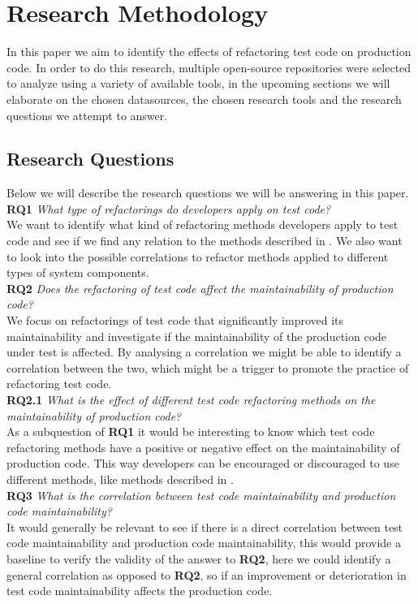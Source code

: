 
\section{Research Methodology}
In this paper we aim to identify the effects of refactoring test code on production code. In order to do this research, multiple open-source repositories were selected to analyze using a variety of available tools, in the upcoming sections we will elaborate on the chosen datasources, the chosen research tools and the research questions we attempt to answer.

\subsection{Research Questions}\label{rqs}
Below we will describe the research questions we will be answering in this paper.\\
\indent\textbf{RQ1} \textit{What type of refactorings do developers apply on test code?}\\
We want to identify what kind of refactoring methods developers apply to test code and see if we find any relation to the methods described in \cite{van2001refactoring}. We also want to look into the possible correlations to refactor methods applied to different types of system components.\\
\indent\textbf{RQ2} \textit{Does the refactoring of test code affect the maintainability of production code?}\\
We focus on refactorings of test code that significantly improved its maintainability and investigate if the maintainability of the production code under test is affected. By analysing a correlation we might be able to identify a correlation between the two, which might be a trigger to promote the practice of refactoring test code.\\
\indent\textbf{RQ2.1} \textit{What is the effect of different test code refactoring methods on the maintainability of production code?}\\
As a subquestion of \textbf{RQ1} it would be interesting to know which test code refactoring methods have a positive or negative effect on the maintainability of production code. This way developers can be encouraged or discouraged to use different methods, like methods described in \cite{van2001refactoring}.\\
\indent\textbf{RQ3} \textit{What is the correlation between test code maintainability and production code maintainability?}\\
It would generally be relevant to see if there is a direct correlation between test code maintainability and production code maintainability, this would provide a baseline to verify the validity of the answer to \textbf{RQ2}, here we could identify a general correlation as opposed to \textbf{RQ2}, so if an improvement or deterioration in test code maintainability affects the production code.

